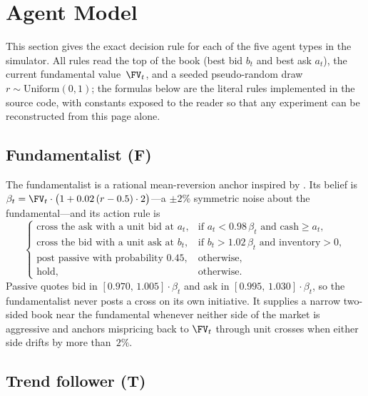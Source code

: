\section{Agent Model}
\label{sec:agents}

This section gives the exact decision rule for each of the five
agent types in the simulator. All rules read the top of the book
(best bid $b_t$ and best ask $a_t$), the current fundamental
value~$\FV_t$, and a seeded pseudo-random draw $r\sim
\text{Uniform}(0,1)$; the formulas below are the literal rules
implemented in the source code, with constants exposed to the
reader so that any experiment can be reconstructed from this page
alone.

\subsection{Fundamentalist (F)}

The fundamentalist is a rational mean-reversion anchor inspired by
\citet{smith1988bubbles}. Its belief is
$\beta_t=\FV_t\cdot\bigl(1+0.02\,(r-0.5)\cdot 2\bigr)$---a
$\pm2\%$ symmetric noise about the fundamental---and its action
rule is
\begin{equation}
\label{eq:fund}
\begin{cases}
\text{cross the ask with a unit bid at }a_t, & \text{if }a_t<0.98\,\beta_t\text{ and cash}\ge a_t,\\
\text{cross the bid with a unit ask at }b_t, & \text{if }b_t>1.02\,\beta_t\text{ and inventory}>0,\\
\text{post passive with probability }0.45, & \text{otherwise,}\\
\text{hold}, & \text{otherwise.}
\end{cases}
\end{equation}
Passive quotes bid in $[0.970,\,1.005]\cdot\beta_t$ and ask in
$[0.995,\,1.030]\cdot\beta_t$, so the fundamentalist never posts a
cross on its own initiative. It supplies a narrow two-sided book
near the fundamental whenever neither side of the market is
aggressive and anchors mispricing back to $\FV_t$ through unit
crosses when either side drifts by more than~$2\%$.

\subsection{Trend follower (T)}

